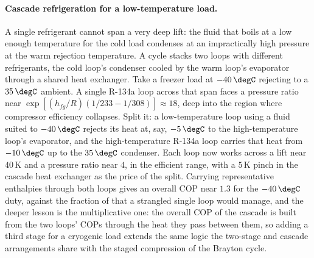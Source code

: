 \paragraph{Cascade refrigeration for a low-temperature load.} A single
refrigerant cannot span a very deep lift: the fluid that boils at a low
enough temperature for the cold load condenses at an impractically high
pressure at the warm rejection temperature. A  cycle stacks
two loops with different refrigerants, the cold loop's condenser cooled by the
warm loop's evaporator through a shared heat exchanger. Take a freezer load at
$-40\,\degC$ rejecting to a $35\,\degC$ ambient. A single R-134a loop across
that span faces a pressure ratio near $\exp[(h_{fg}/R)(1/233 - 1/308)]
\approx 18$, deep into the region where compressor efficiency collapses.
Split it: a low-temperature loop using a fluid suited to $-40\,\degC$ rejects
its heat at, say, $-5\,\degC$ to the high-temperature loop's evaporator, and
the high-temperature R-134a loop carries that heat from $-10\,\degC$ up to the
$35\,\degC$ condenser. Each loop now works across a lift near $40\,\si{
\kelvin}$ and a pressure ratio near $4$, in the efficient range, with a
$5\,\si{\kelvin}$ pinch in the cascade heat exchanger as the price of the
split. Carrying representative enthalpies through both loops gives an overall
COP near $1.3$ for the $-40\,\degC$ duty, against the fraction of that a
strangled single loop would manage, and the deeper lesson is the
multiplicative one: the overall COP of the cascade is built from the two
loops' COPs through the heat they pass between them, so adding a third stage
for a cryogenic load extends the same logic the two-stage and cascade
arrangements share with the staged compression of the Brayton cycle.

